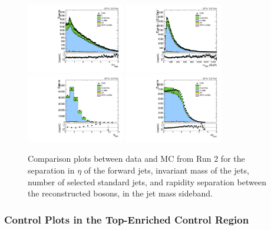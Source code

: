 \begin{figure}[htbp]
  \centering
  \includegraphics[width=0.3825\textwidth]{fig/analysisAppendix/SB_b1_allL_allP_allC_allD_Run2_lnujj_vbfDEta.pdf}
  \includegraphics[width=0.3825\textwidth]{fig/analysisAppendix/SB_b1_allL_allP_allC_allD_Run2_lnujj_vbfMass.pdf}\\
  \includegraphics[width=0.3825\textwidth]{fig/analysisAppendix/SB_b1_allL_allP_allC_allD_Run2_lnujj_nJets.pdf}
  \includegraphics[width=0.3825\textwidth]{fig/analysisAppendix/SB_b1_allL_allP_allC_allD_Run2_dy.pdf}\\
  \caption{
    Comparison plots between data and MC from Run 2 for the separation in $\eta$ of the \VBF forward jets, invariant mass of the \VBF jets, number of selected standard jets, and rapidity separation between the reconstructed bosons, in the jet mass sideband.
  }
  \label{fig:SB_controlPlotsRun2_4}
\end{figure}

\subsubsection{Control Plots in the Top-Enriched Control Region}

